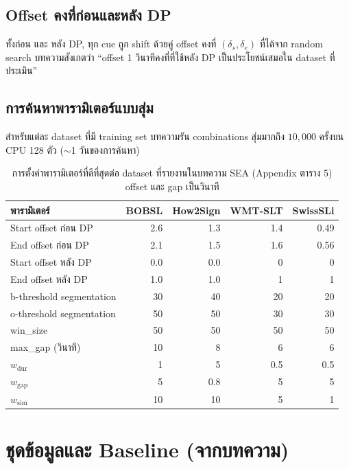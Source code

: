 \documentclass[11pt,a4paper]{article}
\def\texttt#1{#1}%
\def\textbf#1{#1}%
\def\emph#1{#1}%
\begin{document}
\subsection{Offset คงที่ก่อนและหลัง DP}
ทั้งก่อน \emph{และ} หลัง DP, ทุก cue ถูก shift ด้วยคู่ offset คงที่
$(\delta_s, \delta_e)$ ที่ได้จาก random search บทความสังเกตว่า
``offset 1 วินาทีคงที่ที่ใช้หลัง DP เป็นประโยชน์เสมอใน dataset ที่ประเมิน''

\subsection{การค้นหาพารามิเตอร์แบบสุ่ม}
สำหรับแต่ละ dataset ที่มี training set บทความรัน combinations สุ่มมากถึง
$10{,}000$ ครั้งบน CPU 128 ตัว ($\sim$1 วันของการค้นหา)

\begin{table}[h]
\centering
\small
\begin{tabular}{lrrrr}
\toprule
\textbf{พารามิเตอร์} & \textbf{BOBSL} & \textbf{How2Sign} & \textbf{WMT-SLT} & \textbf{SwissSLi} \\
\midrule
Start offset ก่อน DP            & 2.6  & 1.3  & 1.4  & 0.49 \\
End offset ก่อน DP              & 2.1  & 1.5  & 1.6  & 0.56 \\
Start offset หลัง DP            & 0.0  & 0.0  & 0    & 0    \\
End offset หลัง DP              & 1.0  & 1.0  & 1    & 1    \\
\texttt{b-threshold} segmentation & 30  & 40   & 20   & 20   \\
\texttt{o-threshold} segmentation & 50  & 50   & 30   & 30   \\
\texttt{win\_size}               & 50   & 50   & 50   & 50   \\
\texttt{max\_gap} (วินาที)       & 10   & 8    & 6    & 6    \\
$w_{\mathrm{dur}}$               & 1    & 5    & 0.5  & 0.5  \\
$w_{\mathrm{gap}}$               & 5    & 0.8  & 5    & 5    \\
$w_{\mathrm{sim}}$               & 10   & 10   & 5    & 1    \\
\bottomrule
\end{tabular}
\caption{การตั้งค่าพารามิเตอร์ที่ดีที่สุดต่อ dataset ที่รายงานในบทความ SEA
(Appendix ตาราง 5) offset และ gap เป็นวินาที}
\label{tab:paper-params}
\end{table}


\section{ชุดข้อมูลและ Baseline (จากบทความ)}
\label{sec:paper-data}
\end{document}
